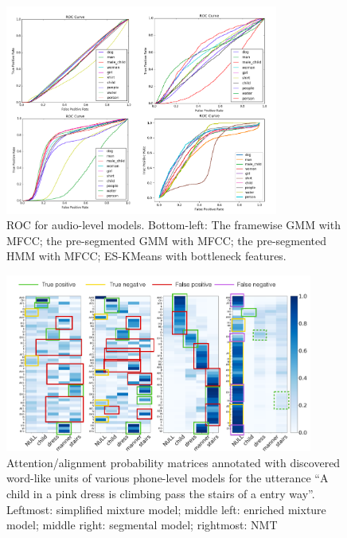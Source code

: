 \documentclass[journal]{IEEEtran}
\begin{document}
\begin{figure}[t]
    \centering
    \includegraphics[width=0.8\textwidth]{fig_4.png}
    \caption{ROC for audio-level models. Bottom-left: The framewise GMM with MFCC; the pre-segmented GMM with MFCC; the pre-segmented HMM with MFCC; ES-KMeans with bottleneck features.}
    \label{fig:roc_audio}
\end{figure}

\begin{figure}[t]
    \centering
    \includegraphics[width=0.9\textwidth]{fig_8.png}
    \caption{Attention/alignment probability matrices annotated with discovered word-like units of various phone-level models for the utterance ``A child in a pink dress is climbing pass the stairs of a entry way''. Leftmost: simplified mixture model; middle left: enriched mixture model; middle right: segmental model; rightmost: NMT}
    \label{fig:attention_plots}
\end{figure}
\end{document}

